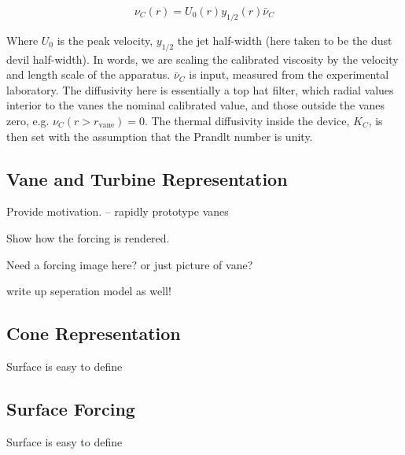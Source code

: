 \begin{equation}
 \nu_C(r) = U_0(r) y_{1/2}(r) \bar \nu_C
\end{equation}

Where $U_0$ is the peak velocity, $y_{1/2}$ the jet half-width (here
taken to be the dust devil half-width). In words, we are scaling the
calibrated viscosity by the velocity and length scale of the
apparatus. $\bar \nu_C $ is input, measured from the experimental
laboratory.  The diffusivity here is essentially a top hat filter, which
radial values interior to the vanes the nominal calibrated value, and
those outside the vanes zero, e.g. $\nu_C(r>r_{\text{vane}})=0$. The
thermal diffusivity inside the device, $K_C$, is then set with the
assumption that the Prandlt number is unity.  

\subsection{Vane and Turbine Representation}


Provide motivation. -- rapidly prototype vanes

Show how the forcing is rendered. 

Need a forcing image here? or just picture of vane?

write up seperation model as well!

\subsection{Cone Representation}

Surface is easy to define

\subsection{Surface Forcing}

Surface is easy to define


